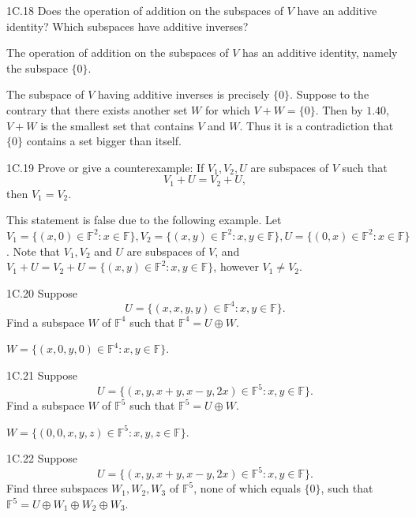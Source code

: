 \documentclass{exam}
\begin{document}
\begin{problem}{1C.18}
    Does the operation of addition on the subspaces of $V$ have an additive identity? Which subspaces have additive inverses?
\end{problem}

The operation of addition on the subspaces of $V$ has an additive identity, namely the subspace $\{0\}$.

The subspace of $V$ having additive inverses is precisely $\{0\}$. Suppose to the contrary that there exists another set $W$ for which $V + W = \{0\}$. Then by $1.40$, $V + W$ is the smallest set that contains $V$ and $W$. Thus it is a contradiction that $\{0\}$ contains a set bigger than itself.

\begin{problem}{1C.19}
    Prove or give a counterexample: If $V_1, V_2, U$ are subspaces of $V$ such that $$V_1 + U = V_2 + U,$$ then $V_1 = V_2$.
\end{problem}

This statement is false due to the following example. Let $V_1 = \{(x, 0)\in\mathbb F^2:x\in\mathbb F\}, V_2 = \{(x, y)\in\mathbb F^2:x, y\in\mathbb F\}, U = \{(0, x)\in\mathbb F^2:x\in\mathbb F\}$. Note that $V_1, V_2$ and $U$ are subspaces of $V$, and $V_1 + U = V_2 + U = \{(x, y)\in\mathbb F^2:x, y\in\mathbb F\}$, however $V_1\neq V_2$.

\begin{problem}{1C.20}
    Suppose $$U = \{(x, x, y, y)\in\mathbb F^4: x, y\in\mathbb F\}.$$ Find a subspace $W$ of $\mathbb F^4$ such that $\mathbb F^4 = U\oplus W$.
\end{problem}

$W = \{(x, 0, y, 0)\in\mathbb F^4: x, y\in\mathbb F\}$.

\begin{problem}{1C.21}
    Suppose $$U = \{(x, y, x + y, x - y, 2x)\in\mathbb F^5:x, y\in\mathbb F\}.$$ Find a subspace $W$ of $\mathbb F^5$ such that $\mathbb F^5 = U\oplus W$.
\end{problem}

$W = \{(0, 0, x, y, z)\in\mathbb F^5:x, y, z\in\mathbb F\}$.

\begin{problem}{1C.22}
    Suppose $$U = \{(x, y, x + y, x - y, 2x)\in\mathbb F^5:x, y\in\mathbb F\}.$$ Find three subspaces $W_1, W_2, W_3$ of $\mathbb F^5$, none of which equals $\{0\}$, such that $\mathbb F^5 = U \oplus W_1 \oplus W_2 \oplus W_3$.
\end{problem}
\end{document}
